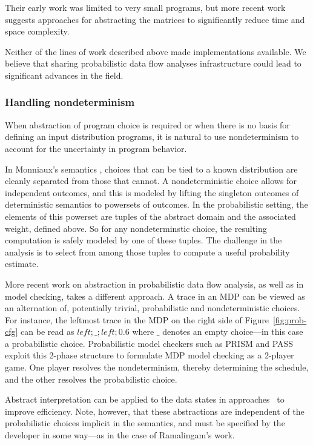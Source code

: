 Their early work was limited to very small programs, but more recent
work suggests approaches for abstracting the matrices to significantly
reduce time and space complexity.   

Neither of the lines of work described above made implementations
available.  We believe that sharing probabilistic data flow analyses
infrastructure could lead to significant advances in the field.

\subsubsection{Handling nondeterminism}
When abstraction of program choice is required or when 
there is no basis for defining an input distribution programs,
it is natural to use nondeterminism to account for the uncertainty
in program behavior.

In Monniaux's semantics \cite{monniaux2005abstract}, choices that can be tied to a known
distribution are cleanly separated from those that cannot.
A nondeterministic choice allows for independent outcomes, and
this is modeled by lifting the singleton outcomes of deterministic
semantics to powersets of outcomes.
In the probabilistic setting, the elements of this powerset are
tuples of the abstract domain and the associated weight, defined
above.  So for any nondeterminstic choice, the resulting computation 
is safely modeled by one of these tuples.  The challenge in the
analysis is to select from among those tuples to compute a useful
probability estimate.

More recent work on abstraction in probabilistic data flow
analysis, as well as in model checking, takes a different approach.
A trace in an MDP can be viewed as an alternation of, potentially trivial,
probabilistic and nondeterministic choices.  For instance, the
leftmost trace in the MDP on the right side of Figure~\ref{fig:prob-cfg}
can be read as $\mathit{left};\_;\mathit{left};0.6$ where $\_$ 
denotes an empty choice---in this case a probabilistic choice.
Probabilistic model checkers such as PRISM and PASS exploit this
2-phase structure to formulate MDP model checking as a 2-player
game.  One player resolves the nondeterminism, thereby determining
the schedule, and the other resolves the probabilistic choice.

Abstract interpretation can be applied to the data states in
approaches~\cite{kwiatkowska2011prism,wachter2010best,esparza2011probabilistic}
to improve efficiency.  Note, however, that these abstractions are
independent of the probabilistic choices implicit in the semantics, and must be specified
by the developer in some way---as in the case of Ramalingam's work.

